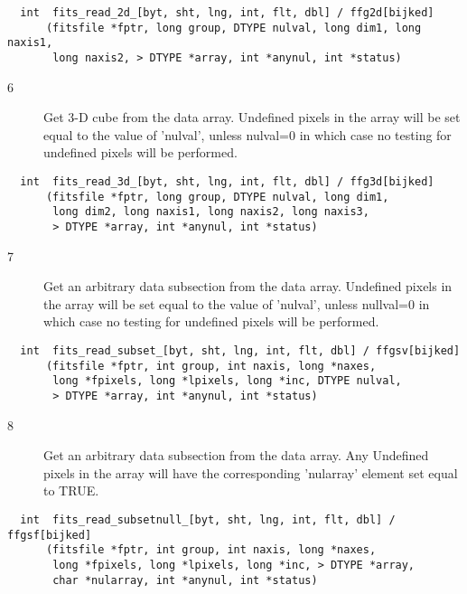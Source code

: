 \begin{verbatim}
  int  fits_read_2d_[byt, sht, lng, int, flt, dbl] / ffg2d[bijked]
      (fitsfile *fptr, long group, DTYPE nulval, long dim1, long naxis1,
       long naxis2, > DTYPE *array, int *anynul, int *status)
\end{verbatim}

\begin{description}
\item[6 ] Get 3-D cube from the data array.   Undefined
    pixels in the array will be set equal to the value of 'nulval',
    unless nulval=0 in which case no testing for undefined pixels will
   be performed.
\end{description}

\begin{verbatim}
  int  fits_read_3d_[byt, sht, lng, int, flt, dbl] / ffg3d[bijked]
      (fitsfile *fptr, long group, DTYPE nulval, long dim1,
       long dim2, long naxis1, long naxis2, long naxis3,
       > DTYPE *array, int *anynul, int *status)
\end{verbatim}


\begin{description}
\item[7 ]   Get an arbitrary data subsection from the data array.  Undefined
       pixels in the array will be set equal to the value of 'nulval',
       unless nullval=0 in which case no testing for undefined pixels will
      be performed.
\end{description}

\begin{verbatim}
  int  fits_read_subset_[byt, sht, lng, int, flt, dbl] / ffgsv[bijked]
      (fitsfile *fptr, int group, int naxis, long *naxes,
       long *fpixels, long *lpixels, long *inc, DTYPE nulval,
       > DTYPE *array, int *anynul, int *status)
\end{verbatim}

\begin{description}
\item[8 ]   Get an arbitrary data subsection from the data array.  Any Undefined
       pixels in the array will have the corresponding 'nularray'
      element set equal to TRUE.
\end{description}

\begin{verbatim}
  int  fits_read_subsetnull_[byt, sht, lng, int, flt, dbl] / ffgsf[bijked]
      (fitsfile *fptr, int group, int naxis, long *naxes,
       long *fpixels, long *lpixels, long *inc, > DTYPE *array,
       char *nularray, int *anynul, int *status)
\end{verbatim}


